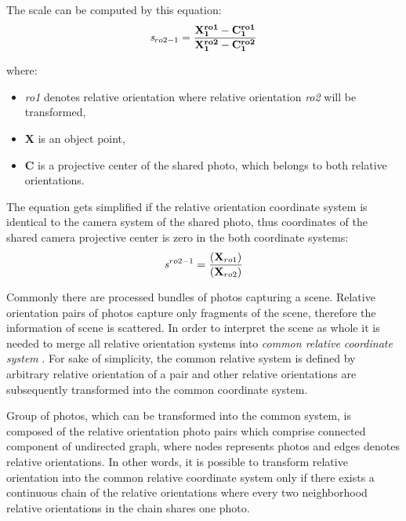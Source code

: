 \documentclass[a4paper,12pt]{article}
\newcommand{\evect}[1]{
{\bf #1}
}
\newcommand{\escal}[1]{
{\it #1}
}
\newcommand{\term}[1]{
{\it #1}
}
\begin{document}
The scale can be computed by this equation:
\begin{equation}
\escal{s}_{ro2-1} = \frac{\mathbf{\evect{X}^{ro1}_{1} - \evect{C^{ro1}_{1}}}}
	                {\mathbf{\evect{X}^{ro2}_{1} - \evect{C^{ro2}_{1}}}}
\end{equation}

where:
\begin{itemize}
\item \term{ro1} denotes relative orientation where relative  orientation \term{ro2} will be transformed,
\item \evect{X} is an object point,
\item \evect{C} is a projective center of the shared photo, which belongs to both relative orientations.
\end{itemize}


The equation gets simplified if the relative orientation coordinate system is identical  to the camera system of the shared photo, thus 
coordinates of the shared camera projective center is zero in the both coordinate systems: 
\begin{equation}
\escal{s}^{ro2-1} = \frac{\mathbf(\evect{X}_{ro1})}
	                 {\mathbf(\evect{X}_{ro2})}
\end{equation}


Commonly there are processed bundles of photos capturing a scene. Relative orientation pairs of photos capture only fragments of the scene, 
therefore the information of scene is scattered.  
In order to interpret the scene as whole it is needed to merge all relative orientation systems into \term{common relative coordinate system}.
For sake of simplicity, the common relative system is defined by arbitrary relative orientation of a pair and other 
relative orientations are subsequently transformed into the common coordinate system. 


Group of photos, which can be transformed into the common system, is composed of the relative orientation photo pairs
which comprise connected component of undirected graph, where nodes represents  photos and edges denotes relative orientations. 
In other words, it is possible to transform relative orientation into the common relative coordinate system only if there 
exists a continuous chain of the relative orientations where every two neighborhood relative orientations in the chain shares one photo.
\end{document}
